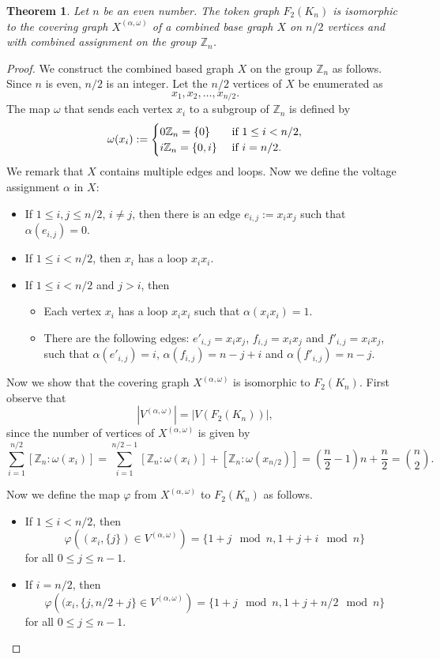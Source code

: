 \documentclass[letterpaper,10pt]{article}
\theoremstyle{plain}
\newtheorem{theorem}{Theorem}[section]
\theoremstyle{definition}
\newcommand{\G}{X}
\begin{document}
\begin{theorem} \label{theo_1}
Let $n$ be an even number. 
The token graph $F_2(K_n)$ is isomorphic to the covering graph $\G^{(\alpha,\omega)}$ of a combined base graph $\G$ on $n/2$ vertices and with combined assignment on the group $\mathbb{Z}_{n}$.
\end{theorem}
\begin{proof}
We construct the combined based graph $\G$ on the group $\mathbb{Z}_{n}$ as follows. 
Since $n$ is even, $n/2$ is an integer. 
Let the $n/2$ vertices of $X$ be enumerated as
\[
x_1,x_2,\dots,x_{n/2}.
\]
The map $\omega$ that sends each vertex $x_i$ to a subgroup of $\mathbb{Z}_n$  is defined by 
\[
	\omega(x_i):=
	\begin{cases}
        0\mathbb{Z}_n=\{0\} & \textnormal{ if }  1\leq i < n/2, \\
		i\mathbb{Z}_n =\{0,i\} & \textnormal{ if }  i=n/2.
	\end{cases}
  \]  
 We remark that $\G$ contains multiple edges and loops. Now we define the voltage assignment $\alpha$ in $\G$: 
\begin{itemize}
    \item If $1\leq i,j\leq n/2$, $i\neq j$, then there is an edge $e_{i,j}:=x_ix_j$ such that $\alpha(e_{i,j})=0$.
    \item If $1\leq i < n/2$, then $x_i$ has a loop $x_ix_i$.
    \item If $1\leq i < n/2$ and $j>i$, then
    \begin{itemize}
        \item Each vertex $x_i$ has a loop $x_ix_i$ such that $\alpha(x_ix_i)=1$.
        \item There are the following edges: $e'_{i,j}=x_ix_j$, $f_{i,j}=x_ix_j$ and $f'_{i,j}=x_ix_j$, such that $\alpha(e'_{i,j})=i$, $\alpha(f_{i,j})=n-j+i$ and $\alpha (f'_{i,j})=n-j$.
    \end{itemize}
\end{itemize}
 
 Now we show that the covering graph $\G^{(\alpha,\omega)}$ is isomorphic to $F_{2}(K_n)$. 
 First observe that 
 \[|V^{(\alpha,\omega)}|=|V(F_2(K_n))|,\]
 since the number of vertices of $\G^{(\alpha,\omega)}$ is given by
\[
\sum_{i=1}^{n/2}[\mathbb{Z}_n:\omega(x_i)]= \sum_{i=1}^{n/2-1}[\mathbb{Z}_n:\omega(x_i)]+ [\mathbb{Z}_n:\omega(x_{n/2})]=\left(\frac{n}{2}-1\right)n+\frac{n}{2}=\binom{n}{2}.
\]

Now we define the map $\varphi$ from $\G^{(\alpha,\omega)}$ to $F_{2}({K_n})$ as follows.
\begin{itemize}
    \item If $ 1\leq i< n/2$, then
\[
\varphi\left((x_i,\{j\})\in V^{(\alpha,\omega)}\right)= \{1+j\mod{n},1+j+i \mod{n}\}%
\]
for all $0\leq j\leq n-1$.
    \item If $i=n/2$, then 
 \[
\varphi\left((x_{i},\{j,n/2+j\}\in V^{(\alpha,\omega)}\right)= \{1+j \mod{n},1+j+n/2 \mod{n}\}%
 \]
 for all  $0\leq j\leq n-1$.
\end{itemize}


\end{proof}
\end{document}
